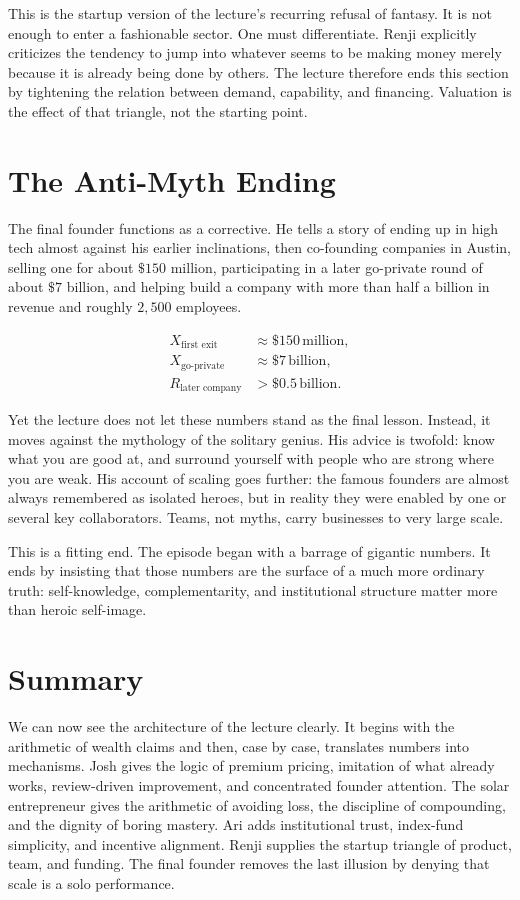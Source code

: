This is the startup version of the lecture's recurring refusal of fantasy. It is not enough to enter a fashionable sector. One must differentiate. Renji explicitly criticizes the tendency to jump into whatever seems to be making money merely because it is already being done by others. The lecture therefore ends this section by tightening the relation between demand, capability, and financing. Valuation is the effect of that triangle, not the starting point.

\section{The Anti-Myth Ending}

The final founder functions as a corrective. He tells a story of ending up in high tech almost against his earlier inclinations, then co-founding companies in Austin, selling one for about $\$150$ million, participating in a later go-private round of about $\$7$ billion, and helping build a company with more than half a billion in revenue and roughly $2{,}500$ employees.

\begin{align}
X_{\text{first exit}} &\approx \$150\,\text{million},\\
X_{\text{go-private}} &\approx \$7\,\text{billion},\\
R_{\text{later company}} &> \$0.5\,\text{billion}.
\end{align}

Yet the lecture does not let these numbers stand as the final lesson. Instead, it moves against the mythology of the solitary genius. His advice is twofold: know what you are good at, and surround yourself with people who are strong where you are weak. His account of scaling goes further: the famous founders are almost always remembered as isolated heroes, but in reality they were enabled by one or several key collaborators. Teams, not myths, carry businesses to very large scale.

This is a fitting end. The episode began with a barrage of gigantic numbers. It ends by insisting that those numbers are the surface of a much more ordinary truth: self-knowledge, complementarity, and institutional structure matter more than heroic self-image.

\section{Summary}

We can now see the architecture of the lecture clearly. It begins with the arithmetic of wealth claims and then, case by case, translates numbers into mechanisms. Josh gives the logic of premium pricing, imitation of what already works, review-driven improvement, and concentrated founder attention. The solar entrepreneur gives the arithmetic of avoiding loss, the discipline of compounding, and the dignity of boring mastery. Ari adds institutional trust, index-fund simplicity, and incentive alignment. Renji supplies the startup triangle of product, team, and funding. The final founder removes the last illusion by denying that scale is a solo performance.

